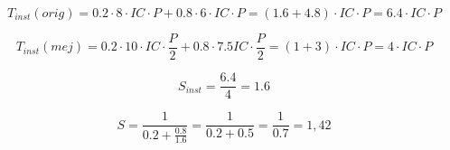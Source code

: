 

\begin{comparchsol}
\end{comparchsol}

\[ 
T_{inst}(orig) = 
0.2 \cdot 8 \cdot IC \cdot P+ 0.8 \cdot 6 \cdot IC \cdot P = 
(1.6 + 4.8) \cdot IC \cdot P = 
6.4 \cdot IC \cdot P 
\]

\[ 
T_{inst}(mej) = 
0.2 \cdot 10 \cdot IC \cdot \frac{P}{2} + 0.8 \cdot 7.5 IC \cdot \frac{P}{2} = 
(1 + 3) \cdot IC \cdot P = 
4 \cdot IC \cdot P 
\]

\[ 
S_{inst} = 
\frac{6.4}{4} = 
1.6 
\]

\[ 
S = 
\frac{1}{0.2 + \frac{0.8}{1.6}} = 
\frac{1}{0.2 + 0.5} = 
\frac{1}{0.7} =1,42 
\]

